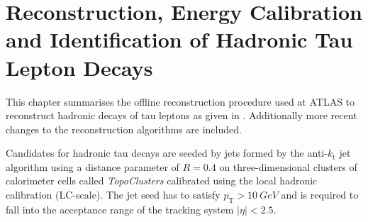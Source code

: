 \chapter{Reconstruction, Energy Calibration and
  Identification of Hadronic Tau Lepton Decays}
\label{sec:reconstruction}

%
%
This chapter summarises the offline reconstruction procedure used at ATLAS to
reconstruct hadronic decays of tau leptons as given in \cite{atlas:taurec:run1,
  atlas:taurec:run2}. Additionally more recent changes to the reconstruction
algorithms are included.

Candidates for hadronic tau decays are seeded by jets formed by the
anti-$k_\mathrm{t}$ jet algorithm using a distance parameter of $R = 0.4$ on
three-dimensional clusters of calorimeter cells called \emph{TopoClusters}
calibrated using the local hadronic calibration (LC-scale). The jet seed has to
satisfy $p_\mathrm{T} > \SI{10}{GeV}$ and is required to fall into the
acceptance range of the tracking system $|\eta| < \num{2.5}$. 

